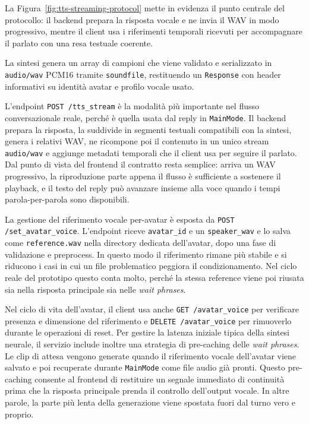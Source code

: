 La Figura~\ref{fig:tts-streaming-protocol} mette in evidenza il punto centrale del protocollo: il backend prepara la risposta vocale e ne invia il WAV in modo progressivo, mentre il client usa i riferimenti temporali ricevuti per accompagnare il parlato con una resa testuale coerente.

La sintesi genera un array di campioni che viene validato e serializzato in \texttt{audio/wav} PCM16 tramite \texttt{soundfile}, restituendo un \texttt{Response} con header informativi su identità avatar e profilo vocale usato.

L'endpoint \texttt{POST /tts\_stream} è la modalità più importante nel flusso conversazionale reale, perché è quella usata dal reply in \texttt{MainMode}. Il backend prepara la risposta, la suddivide in segmenti testuali compatibili con la sintesi, genera i relativi WAV, ne ricompone poi il contenuto in un unico stream \texttt{audio/wav} e aggiunge metadati temporali che il client usa per seguire il parlato. Dal punto di vista del frontend il contratto resta semplice: arriva un WAV progressivo, la riproduzione parte appena il flusso è sufficiente a sostenere il playback, e il testo del reply può avanzare insieme alla voce quando i tempi parola-per-parola sono disponibili.

La gestione del riferimento vocale per-avatar è esposta da \texttt{POST /set\_avatar\_voice}. L'endpoint riceve \texttt{avatar\_id} e un \texttt{speaker\_wav} e lo salva come \texttt{reference.wav} nella directory dedicata dell'avatar, dopo una fase di validazione e preprocess. In questo modo il riferimento rimane più stabile e si riducono i casi in cui un file problematico peggiora il condizionamento. Nel ciclo reale del prototipo questo conta molto, perché la stessa reference viene poi riusata sia nella risposta principale sia nelle \emph{wait phrases}.

Nel ciclo di vita dell'avatar, il client usa anche \texttt{GET /avatar\_voice} per verificare presenza e dimensione del riferimento e \texttt{DELETE /avatar\_voice} per rimuoverlo durante le operazioni di reset. Per gestire la latenza iniziale tipica della sintesi neurale, il servizio include inoltre una strategia di pre-caching delle \emph{wait phrases}. Le clip di attesa vengono generate quando il riferimento vocale dell'avatar viene salvato e poi recuperate durante \texttt{MainMode} come file audio già pronti. Questo pre-caching consente al frontend di restituire un segnale immediato di continuità prima che la risposta principale prenda il controllo dell'output vocale. In altre parole, la parte più lenta della generazione viene spostata fuori dal turno vero e proprio.

